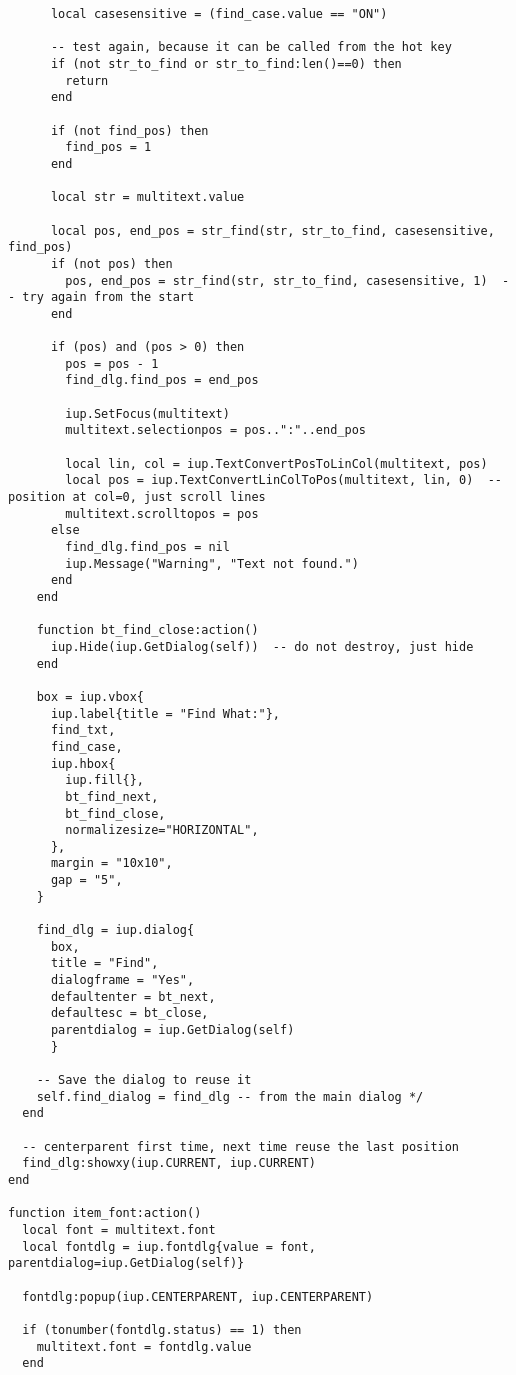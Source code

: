 \documentclass{ctexart}
\begin{document}
\begin{lstlisting}
      local casesensitive = (find_case.value == "ON")

      -- test again, because it can be called from the hot key
      if (not str_to_find or str_to_find:len()==0) then
        return
      end

      if (not find_pos) then
        find_pos = 1
      end

      local str = multitext.value

      local pos, end_pos = str_find(str, str_to_find, casesensitive, find_pos)
      if (not pos) then
        pos, end_pos = str_find(str, str_to_find, casesensitive, 1)  -- try again from the start
      end

      if (pos) and (pos > 0) then
        pos = pos - 1
        find_dlg.find_pos = end_pos

        iup.SetFocus(multitext)
        multitext.selectionpos = pos..":"..end_pos

        local lin, col = iup.TextConvertPosToLinCol(multitext, pos)
        local pos = iup.TextConvertLinColToPos(multitext, lin, 0)  -- position at col=0, just scroll lines
        multitext.scrolltopos = pos
      else
        find_dlg.find_pos = nil
        iup.Message("Warning", "Text not found.")
      end
    end

    function bt_find_close:action()
      iup.Hide(iup.GetDialog(self))  -- do not destroy, just hide
    end

    box = iup.vbox{
      iup.label{title = "Find What:"},
      find_txt,
      find_case,
      iup.hbox{
        iup.fill{},
        bt_find_next,
        bt_find_close,
        normalizesize="HORIZONTAL", 
      },
      margin = "10x10", 
      gap = "5",
    }

    find_dlg = iup.dialog{
      box, 
      title = "Find", 
      dialogframe = "Yes", 
      defaultenter = bt_next, 
      defaultesc = bt_close,
      parentdialog = iup.GetDialog(self)
      }

    -- Save the dialog to reuse it 
    self.find_dialog = find_dlg -- from the main dialog */
  end

  -- centerparent first time, next time reuse the last position
  find_dlg:showxy(iup.CURRENT, iup.CURRENT)
end

function item_font:action()
  local font = multitext.font
  local fontdlg = iup.fontdlg{value = font, parentdialog=iup.GetDialog(self)}

  fontdlg:popup(iup.CENTERPARENT, iup.CENTERPARENT)

  if (tonumber(fontdlg.status) == 1) then
    multitext.font = fontdlg.value
  end


\end{lstlisting}
\end{document}
